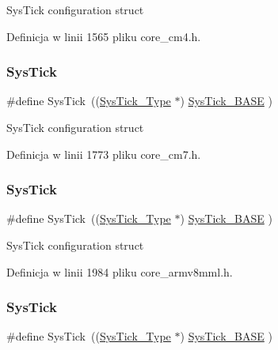 Sys\+Tick configuration struct 

Definicja w linii 1565 pliku core\+\_\+cm4.\+h.

\mbox{\label{group___c_m_s_i_s__core__base_gacd96c53beeaff8f603fcda425eb295de}} 
\subsubsection{\texorpdfstring{Sys\+Tick}{SysTick}\hspace{0.1cm}{\footnotesize\ttfamily [10/12]}}
{\footnotesize\ttfamily \#define Sys\+Tick~((\hyperlink{struct_sys_tick___type}{Sys\+Tick\+\_\+\+Type}   $\ast$)     \hyperlink{group___c_m_s_i_s__core__base_ga58effaac0b93006b756d33209e814646}{Sys\+Tick\+\_\+\+B\+A\+SE}  )}

Sys\+Tick configuration struct 

Definicja w linii 1773 pliku core\+\_\+cm7.\+h.

\mbox{\label{group___c_m_s_i_s__core__base_gacd96c53beeaff8f603fcda425eb295de}} 
\subsubsection{\texorpdfstring{Sys\+Tick}{SysTick}\hspace{0.1cm}{\footnotesize\ttfamily [11/12]}}
{\footnotesize\ttfamily \#define Sys\+Tick~((\hyperlink{struct_sys_tick___type}{Sys\+Tick\+\_\+\+Type}   $\ast$)     \hyperlink{group___c_m_s_i_s__core__base_ga58effaac0b93006b756d33209e814646}{Sys\+Tick\+\_\+\+B\+A\+SE}     )}

Sys\+Tick configuration struct 

Definicja w linii 1984 pliku core\+\_\+armv8mml.\+h.

\mbox{\label{group___c_m_s_i_s__core__base_gacd96c53beeaff8f603fcda425eb295de}} 
\subsubsection{\texorpdfstring{Sys\+Tick}{SysTick}\hspace{0.1cm}{\footnotesize\ttfamily [12/12]}}
{\footnotesize\ttfamily \#define Sys\+Tick~((\hyperlink{struct_sys_tick___type}{Sys\+Tick\+\_\+\+Type}   $\ast$)     \hyperlink{group___c_m_s_i_s__core__base_ga58effaac0b93006b756d33209e814646}{Sys\+Tick\+\_\+\+B\+A\+SE}     )}

